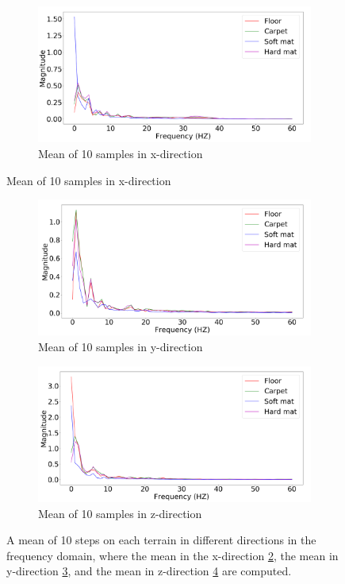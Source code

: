 \documentclass[USenglish]{ifimaster}  %
\begin{document}
\begin{figure}[h]
	\centering
	\begin{subfigure}[b]{0.95\textwidth}
		\includegraphics[width=1\linewidth]{Figures/fftx}
		\caption{Mean of 10 samples in x-direction}
		\label{fig:fftx} 
	\end{subfigure}
\end{figure}
\begin{figure}[h] \ContinuedFloat	
	\begin{subfigure}[b]{0.95\textwidth}
		\includegraphics[width=1\linewidth]{Figures/ffty}
		\caption{Mean of 10 samples in y-direction}
		\label{fig:ffty}
	\end{subfigure}
	
	
	\begin{subfigure}[h]{0.95\textwidth}
		\includegraphics[width=1\linewidth]{Figures/fftz}
		\caption{Mean of 10 samples in z-direction}
		\label{fig:fftz}
	\end{subfigure}
	
	\caption[Examples of the mean of each terrain for each direction in the frequency domain]{A mean of 10 steps on each terrain in different directions in the	frequency domain, where the mean in the x-direction \ref{fig:fftx}, the mean in y-direction \ref{fig:ffty},	and the mean in z-direction \ref{fig:fftz} are computed.}
	\label{fig:fftxyz}
\end{figure}
\end{document}
